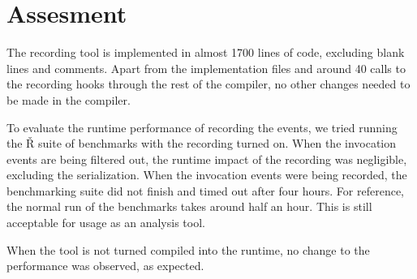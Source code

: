\section{Assesment}


The recording tool is implemented in almost 1700 lines of code, excluding blank lines and comments. Apart from the implementation files and around 40 calls to the recording hooks through the rest of the compiler, no other changes needed to be made in the compiler.

To evaluate the runtime performance of recording the events, we tried running the Ř suite of benchmarks with the recording turned on. When the invocation events are being filtered out, the runtime impact of the recording was negligible, excluding the serialization. When the invocation events were being recorded, the benchmarking suite did not finish and timed out after four hours. For reference, the normal run of the benchmarks takes around half an hour. This is still acceptable for usage as an analysis tool.

When the tool is not turned compiled into the runtime, no change to the performance was observed, as expected.

